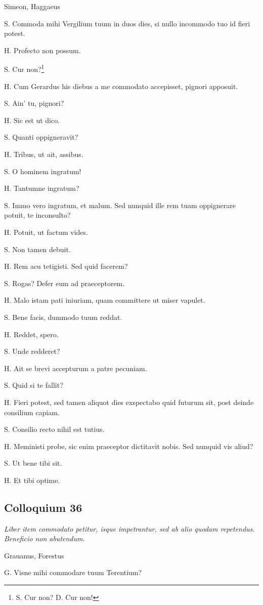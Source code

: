 \documentclass{article}
\begin{document}
Simeon, Haggaeus

S. Commoda mihi Vergilium tuum in duos dies, si nullo incommodo tuo id fieri potest.

H. Profecto non possum.

S. Cur non?\footnote{S. Cur non? D. Cur non!}

H. Cum Gerardus his diebus a me commodato accepisset, pignori apposuit.

S. Ain' tu, pignori?

H. Sic est ut dico.

S. Quanti oppigneravit?

H. Tribus, ut ait, assibus.

S. O hominem ingratum!

H. Tantumne ingratum?

S. Immo vero ingratum, et malum. Sed nunquid ille rem tuam oppignerare potuit, te inconsulto?

H. Potuit, ut factum vides.

S. Non tamen debuit.

H. Rem acu tetigisti. Sed quid facerem?

S. Rogas? Defer eum ad praeceptorem.

 
H. Malo istam pati iniuriam, quam committere ut miser vapulet.

S. Bene facis, dummodo tuum reddat.

H. Reddet, spero.

S. Unde redderet?

H. Ait se brevi accepturum a patre pecuniam.

S. Quid si te fallit?

H. Fieri potest, sed tamen aliquot dies exspectabo quid futurum sit, post deinde consilium capiam.

S. Consilio recto nihil est tutius.

H. Meministi probe, sic enim praeceptor dictitavit nobis. Sed nunquid vis aliud?

S. Ut bene tibi sit.

H. Et tibi optime.

\subsection{Colloquium 36}
\emph{Liber item commodato petitur, isque impetrantur, sed ab alio quodam repetendus. Beneficio non abutendum.}

Grauanus, Forestus

G. Visne mihi commodare tuum Terentium?
\end{document}
